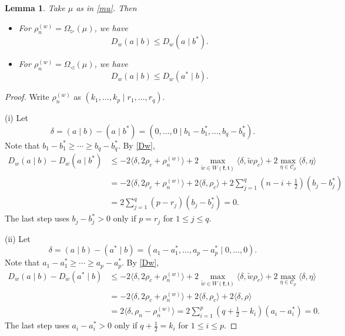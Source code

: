 \documentclass[11pt]{amsart}
\theoremstyle{plain}
\newtheorem{lemma}[thm]{Lemma}
\theoremstyle{definition}
\newcommand{\mfk}{\mathfrak{k}}
\newcommand{\mft}{\mathfrak{t}}
\newcommand{\C}{\mathcal{C}}
\begin{document}
\begin{lemma}\label{JD}
	Take $\mu$ as in \eqref{mu}. Then
	\begin{itemize}
		\item[(i)] For $\rho_n^{(w)}=\Omega_{\rhd}(\mu)$, we have
		\begin{equation}\label{Dw-b}
			D_w(a\mid b)\le D_w(a\mid b^*).
		\end{equation}
		\item[(ii)]  For $\rho_n^{(w)}=\Omega_{\lhd}(\mu)$, we have
		\begin{equation}\label{Dw-a}
			D_w(a\mid b)\le D_w(a^*\mid b).
		\end{equation}
	\end{itemize}
\end{lemma}
\begin{proof}
	Write $\rho_n^{(w)}$ as $(k_1,\dots,k_p\mid r_1,\dots,r_q)$.
	
(i)  Let
	\[\delta=(a\mid b)-(a\mid b^*)=(0,\dots,0\mid b_1-b_1^*,\dots,b_q-b_q^*).\]
	Note that $b_1-b_1^*\ge \cdots\ge b_q-b_q^*$.  By \eqref{Dw},
	\begin{align*}
		D_w(a\mid b)-D_w(a\mid b^*)&\le -2\langle\delta,2\rho_c+\rho_n^{(w)}\rangle+2\max_{\widetilde{w}\in W(\mfk,\mft)}\langle \delta,\widetilde{w}\rho_c\rangle +2\max_{\eta\in\C_\rho}\langle \delta,\eta\rangle\\
		&=-2\langle\delta,2\rho_c+\rho_n^{(w)}\rangle+ 2\langle \delta,\rho_c\rangle +2\sum_{j=1}^q\left(n-i+\frac{1}{2}\right)(b_j-b_j^*)\\
		&=2\sum_{j=1}^q(p-r_j)(b_j-b_j^*)=0.
	\end{align*}
	The last step uses $b_j-b_j^*>0$ only if $p=r_j$ for $1\le j\le q$.
	
(ii) Let
\[\delta=(a\mid b)-(a^*\mid b)=(a_1-a_1^*,\dots,a_p-a_p^*\mid 0,\dots, 0).\]
Note that $a_1-a_1^*\ge\cdots\ge a_p-a_p^*$. By \eqref{Dw},
	\begin{align*}
	D_w(a\mid b)-D_w(a^*\mid b)&\le -2\langle\delta,2\rho_c+\rho_n^{(w)}\rangle+2\max_{\widetilde{w}\in W(\mfk,\mft)}\langle \delta,\widetilde{w}\rho_c\rangle +2\max_{\eta\in\C_\rho}\langle \delta,\eta\rangle\\
	&=-2\langle\delta,2\rho_c+\rho_n^{(w)}\rangle+ 2\langle \delta,\rho_c\rangle +2\langle \delta,\rho\rangle\\
	&= 2\langle\delta, \rho_n-\rho_n^{(w)} \rangle=2\sum_{i=1}^p\left(q+\frac{1}{2}-k_i\right)(a_i-a_i^*)=0.
\end{align*}
The last step uses $a_i-a_i^*>0$ only if $q+\frac{1}{2}=k_i$ for $1\le i\le p$.
\end{proof}
\end{document}
